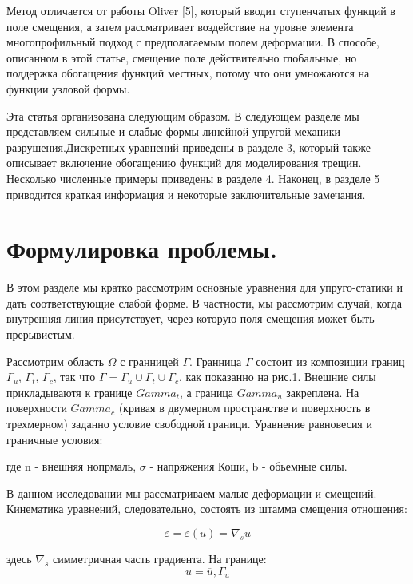 \documentclass[a4paper,12pt]{article}
\begin{document}
Метод отличается от работы Oliver [5], который вводит ступенчатых функций в
поле смещения, а затем рассматривает воздействие на уровне элемента многопрофильный
подход с предполагаемым полем деформации. В способе, описанном в этой статье,
смещение поле действительно глобальные, но поддержка обогащения функций местных,
потому что они умножаются на функции узловой формы.

Эта статья организована следующим образом. В следующем разделе мы представляем
сильные и слабые формы линейной упругой механики разрушения.Дискретных уравнений
приведены в разделе 3, который также описывает включение обогащению функций для
моделирования трещин. Несколько численные примеры приведены в разделе 4. Наконец,
в разделе 5 приводится краткая информация и некоторые заключительные замечания.


\section{Формулировка проблемы.}

В этом разделе мы кратко рассмотрим основные уравнения для упруго-статики
и дать соответствующие слабой форме. В частности, мы рассмотрим случай,
когда внутренняя линия присутствует, через которую поля смещения может быть прерывистым.

Рассмотрим область $\Omega$ с гранницей $\Gamma$. Гранница $\Gamma$ состоит из
композиции границ $\Gamma_u$, $\Gamma_t$, $\Gamma_c$, так что 
$\Gamma = \Gamma_u \cup \Gamma_t \cup \Gamma_c$, как показанно на рис.1. 
Внешние силы прикладываютя к границе $Gamma_t$, а граница $Gamma_u$ закреплена.
На поверхности $Gamma_c$ (кривая в двумерном пространстве и поверхность в трехмерном)
заданно условие свободной граници.
Уравнение равновесия и граничные условия:

где n - внешняя нопрмаль, $\sigma$ - напряжения Коши, b - обьемные силы.

В данном исследовании мы рассматриваем малые
деформации и смещений. Кинематика уравнений, следовательно,
состоять из штамма смещения отношения:

\begin{equation}
    \varepsilon = \varepsilon(u) = \nabla_su
\end{equation} 

здесь $\nabla_s$ симметричная часть градиента. 
На границе:
\begin{equation}
    u = \overline{u}, \Gamma_u
\end{equation} 
\end{document}
